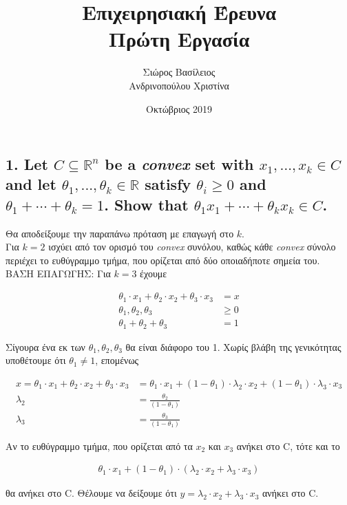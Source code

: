 \documentclass[12pt]{article}
\title{\hugeΑλγοριθμική Επιχειρησιακή Έρευνα\\Πρώτη Εργασία}
\author{Σιώρος Βασίλειος\\Ανδρινοπούλου Χριστίνα}
\date{Οκτώβριος 2019}
\newcommand{\R}{\mathbb{R}}
\begin{document}
\maketitle
\thispagestyle{empty}

\pagebreak


\subsection*{1. Let $C \subseteq \R^n$ be a \textit{convex} set with $x_1 , \dotsc, x_k \in C$ and let $θ_1 , . . . , θ_k \in \R$ satisfy $θ_i \geq 0$ and
$θ_1 + \dotsb + θ_k = 1$. Show that $θ_1x_1 + \dotsb + θ_kx_k \in C$.}

Θα αποδείξουμε την παραπάνω πρόταση με επαγωγή στο $k$.\\

Για $k = 2$ ισχύει από τον ορισμό του \textit{convex} συνόλου,
καθώς κάθε \textit{convex} σύνολο περιέχει το ευθύγραμμο τμήμα, που ορίζεται από δύο οποιαδήποτε σημεία του.\\

ΒΑΣΗ ΕΠΑΓΩΓΗΣ: Για $k = 3$ έχουμε 

\begin{align*}
    θ_1 \cdot x_1 + θ_2 \cdot x_2 + θ_3 \cdot x_3 & = x \\ 
    θ_1, θ_2, θ_3 & \geq 0 \\
    θ_1 + θ_2 + θ_3 & = 1
\end{align*}

Σίγουρα ένα εκ των $θ_1, θ_2, θ_3$ θα είναι διάφορο του 1. Χωρίς βλάβη της γενικότητας υποθέτουμε ότι 
$θ_1 \neq 1$, επομένως

\begin{align*}
    x = θ_1 \cdot x_1 +  θ_2 \cdot x_2 + θ_3 \cdot x_3 & = θ_1 \cdot x_1 + (1 - θ_1) \cdot λ_2 \cdot x_2 + (1 - θ_1) \cdot λ_3 \cdot x_3 \\
    λ_2 & = \frac{θ_2}{(1 - θ_1)} \\
    λ_3 & = \frac{θ_3}{(1 - θ_1)}
\end{align*}

Αν το ευθύγραμμο τμήμα, που ορίζεται από τα $x_2$ και $x_3$ ανήκει στο C, τότε και το

\begin{align*}
    θ_1 \cdot x_1 + (1 - θ_1) \cdot (λ_2 \cdot x_2 + λ_3 \cdot x_3)
\end{align*}

θα ανήκει στο C. Θέλουμε να δείξουμε ότι $y = λ_2 \cdot x_2 + λ_3 \cdot x_3$ ανήκει στο C.
\end{document}
